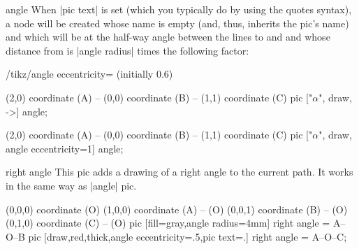\begin{pictype}{angle}{}
    When |pic text| is set (which you typically do by using the quotes syntax),
    a node will be created whose name is empty (and, thus, inherits the pic's
    name) and which will be at the half-way angle between the lines to 
    and  and whose distance from  is |angle radius| times the
    following factor:
    \begin{key}{/tikz/angle eccentricity= (initially 0.6)}
\begin{codeexample}[]
\tikz \draw (2,0) coordinate (A) -- (0,0) coordinate (B)
         -- (1,1) coordinate (C)
  pic ["$\alpha$", draw, ->] {angle};
\end{codeexample}
\begin{codeexample}[]
\tikz \draw (2,0) coordinate (A) -- (0,0) coordinate (B)
         -- (1,1) coordinate (C)
  pic ["$\alpha$", draw, angle eccentricity=1] {angle};
\end{codeexample}
\begin{codeexample}[]
\end{codeexample}
    \end{key}
\end{pictype}

\begin{pictype}{right angle}{}
    This pic adds a drawing of a right angle to the current path. It works in
    the same way as |angle| pic.
\begin{codeexample}[]
  \tikz
    \draw (0,0,0) coordinate (O)
      (1,0,0) coordinate (A) -- (O)
      (0,0,1) coordinate (B) -- (O)
      (0,1,0) coordinate (C) -- (O)
      pic [fill=gray,angle radius=4mm] {right angle = A--O--B}
      pic [draw,red,thick,angle eccentricity=.5,pic text=.]
        {right angle = A--O--C};
\end{codeexample}
\end{pictype}


